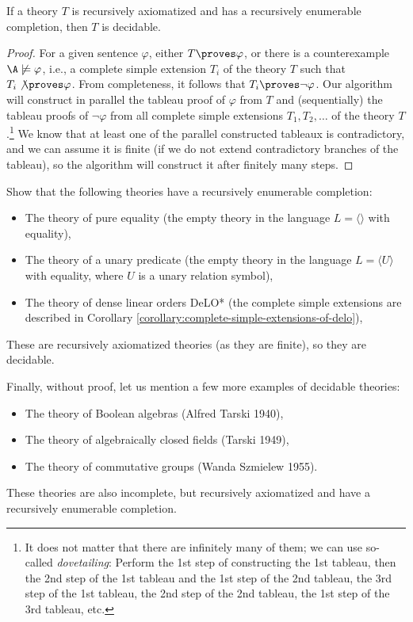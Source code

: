 \begin{proposition}\label{propositon:recursively-enumerable-completion}    
    If a theory $T$ is recursively axiomatized and has a recursively enumerable completion, then $T$ is decidable.
\end{proposition}
\begin{proof}
For a given sentence $\varphi$, either $T \proves \varphi$, or there is a counterexample $\A \not\models \varphi$, i.e., a complete simple extension $T_i$ of the theory $T$ such that $T_i \not\proves \varphi$. From completeness, it follows that $T_i \proves \neg \varphi$. Our algorithm will construct in parallel the tableau proof of $\varphi$ from $T$ and (sequentially) the tableau proofs of $\neg \varphi$ from all complete simple extensions $T_1, T_2, \dots$ of the theory $T$.\footnote{It does not matter that there are infinitely many of them; we can use so-called \emph{dovetailing}: Perform the 1st step of constructing the 1st tableau, then the 2nd step of the 1st tableau and the 1st step of the 2nd tableau, the 3rd step of the 1st tableau, the 2nd step of the 2nd tableau, the 1st step of the 3rd tableau, etc.} We know that at least one of the parallel constructed tableaux is contradictory, and we can assume it is finite (if we do not extend contradictory branches of the tableau), so the algorithm will construct it after finitely many steps.
\end{proof}

\begin{exercise}
Show that the following theories have a recursively enumerable completion:
\begin{itemize}
\item The theory of pure equality (the empty theory in the language $L = \langle \rangle$ with equality),
\item The theory of a unary predicate (the empty theory in the language $L = \langle U \rangle$ with equality, where $U$ is a unary relation symbol),
\item The theory of dense linear orders DeLO* (the complete simple extensions are described in Corollary \ref{corollary:complete-simple-extensions-of-delo}),
\end{itemize}
These are recursively axiomatized theories (as they are finite), so they are decidable.
\end{exercise}

\begin{example}
    Finally, without proof, let us mention a few more examples of decidable theories:
    \begin{itemize}  
        \item The theory of Boolean algebras (Alfred Tarski 1940),
        \item The theory of algebraically closed fields (Tarski 1949),
        \item The theory of commutative groups (Wanda Szmielew 1955).
    \end{itemize}
    These theories are also incomplete, but recursively axiomatized and have a recursively enumerable completion.    
\end{example}

